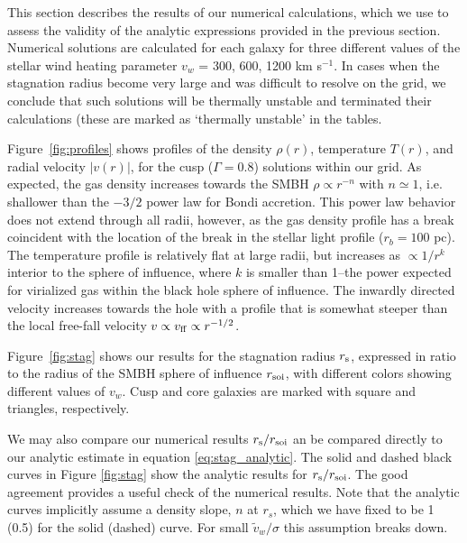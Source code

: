 \documentclass[usenatbib,fleqn]{mn2e}
\newcommand{\rs}{r_s}
\newcommand{\rb}{r_b}
\newcommand{\vw}{\tilde{v}_{w}}
\begin{document}
This section describes the results of our numerical calculations,
which we use to assess the validity of the analytic expressions
provided in the previous section.  Numerical solutions are calculated
for each galaxy for three different values of the stellar wind heating
parameter $v_{w}$ = 300, 600, 1200 km s$^{-1}$.  In cases when the stagnation radius become very large and was difficult to resolve on the grid, we conclude that such solutions will be thermally unstable and terminated their calculations (these are marked as `thermally unstable' in the tables.  

Figure~\ref{fig:profiles} shows profiles of the density $\rho(r)$,
temperature $T(r)$, and radial velocity $|v(r)|$, for the cusp
($\Gamma=0.8$) solutions within our grid.  As expected, the gas
density increases towards the SMBH $\rho\propto r^{-n}$ with
$n\simeq1$, i.e. shallower than the $-3/2$ power law for
Bondi accretion. This power law behavior does not extend
through all radii, however, as the gas density profile has a break coincident
with the location of the break in the stellar light profile ($\rb=100$
pc). The temperature profile is relatively flat at large radii, but
increases as $\propto 1/r^{k}$ interior to the sphere of influence,
where $k$ is smaller than 1--the power expected for virialized gas within the black hole sphere of influence.
The inwardly directed velocity increases towards the hole with a profile that is somewhat steeper than the local free-fall velocity $v \propto v_{\rm ff}\propto r^{-1/2}$.


Figure~\ref{fig:stag} shows our results for the
stagnation radius $r_{\rm s}$, expressed in ratio to the radius of the
SMBH sphere of influence $r_{\rm soi}$, with different colors showing
different values of $v_{w}$.  Cusp and core galaxies are marked with
square and triangles, respectively.  

 We may also compare our numerical results $r_{\rm s}/r_{\rm
  soi}$ an be compared directly to our analytic estimate in equation
\ref{eq:stag_analytic}.  The solid and dashed black curves in  Figure
\ref{fig:stag} show the analytic results for $r_{\rm s}/r_{\rm soi}$.
The good agreement provides a useful check of the numerical
results. Note that the analytic curves implicitly assume a density
slope, $n$ at $\rs$, which we have fixed to be 1 (0.5) for the solid
(dashed) curve. For small $\vw/\sigma$ this assumption breaks down.
\end{document}
